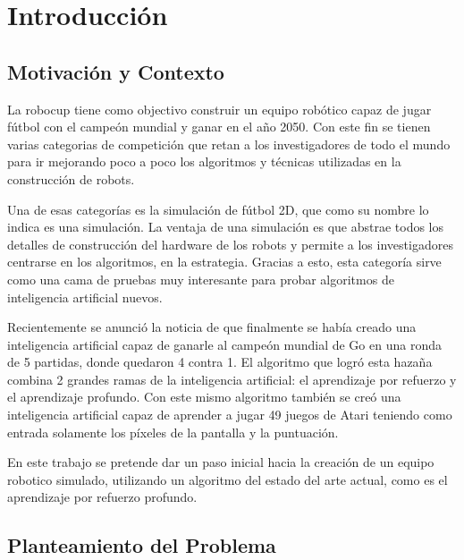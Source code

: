 \chapter{Introducción}

%


\section{Motivación y Contexto}

La robocup tiene como objectivo construir un equipo robótico capaz de jugar fútbol con el campeón mundial y ganar en el año 2050. Con este fin se tienen varias categorias de competición que retan a los investigadores de todo el mundo para ir mejorando poco a poco los algoritmos y técnicas utilizadas en la construcción de robots.

Una de esas categorías es la simulación de fútbol 2D, que como su nombre lo indica es una simulación. La ventaja de una simulación es que abstrae todos los detalles de construcción del hardware de los robots y permite a los investigadores centrarse en los algoritmos, en la estrategia. Gracias a esto, esta categoría sirve como una cama de pruebas muy interesante para probar algoritmos de inteligencia artificial nuevos.

Recientemente se anunció la noticia de que finalmente se había creado una inteligencia artificial capaz de ganarle al campeón mundial de Go en una ronda de 5 partidas, donde quedaron 4 contra 1. El algoritmo que logró esta hazaña combina 2 grandes ramas de la inteligencia artificial: el aprendizaje por refuerzo y el aprendizaje profundo. Con este mismo algoritmo también se creó una inteligencia artificial capaz de aprender a jugar 49 juegos de Atari teniendo como entrada solamente los píxeles de la pantalla y la puntuación.

En este trabajo se pretende dar un paso inicial hacia la creación de un equipo robotico simulado, utilizando un algoritmo del estado del arte actual, como es el aprendizaje por refuerzo profundo.


\section{Planteamiento del Problema}

